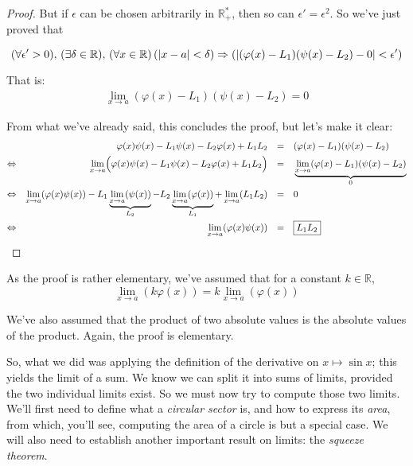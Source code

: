 \documentclass[solutions.tex]{subfiles}
\begin{document}
\begin{proof}
But if $\epsilon$ can be chosen arbitrarily in $\mathbb{R}^*_+$, then
so can $\epsilon'=\epsilon^2$. So we've just proved that

\[ \epsdelta{\epsilon'}{\delta}{a}{x}{(\varphi(x)-L_1)(\psi(x)-L_2)}{0}  \]

That is:
\begin{equation*} \begin{aligned}
	\lim_{x\rightarrow a}(\varphi(x)-L_1)(\psi(x)-L_2) = 0
\end{aligned} \end{equation*}

From what we've already said, this concludes the proof, but let's
make it clear:
\begin{equation*} \begin{aligned}
	~ && \varphi(x)\psi(x)-L_1\psi(x)-L_2\varphi(x)+L_1L_2 &&=\quad&
		(\varphi(x)-L_1)(\psi(x)-L_2) \\
	\Leftrightarrow &&
		\lim_{x\rightarrow a}\Bigl(\varphi(x)\psi(x)-L_1\psi(x)-L_2\varphi(x)+L_1L_2\Bigr) &&=\quad&
		\underbrace{\lim_{x\rightarrow a}(\varphi(x)-L_1)(\psi(x)-L_2)}_0 \\
	\Leftrightarrow &&
		\lim_{x\rightarrow a}(\varphi(x)\psi(x))
		-L_1\underbrace{\lim_{x\rightarrow a}(\psi(x))}_{L_2}
		-L_2\underbrace{\lim_{x\rightarrow a}(\varphi(x))}_{L_1}
		+\lim_{x\rightarrow a}(L_1L_2) &&=\quad& 0 \\
	\Leftrightarrow &&
		\lim_{x\rightarrow a}(\varphi(x)\psi(x)) &&=\quad& \boxed{L_1L_2}
\end{aligned} \end{equation*}
\end{proof}
\begin{remark} As the proof is rather elementary, we've assumed that for a
constant $k\in\mathbb{R}$,
\[
	\lim_{x\rightarrow a}(k\varphi(x))=k\lim_{x\rightarrow a}(\varphi(x))
\]

We've also assumed that the product of two absolute values is the
absolute values of the product. Again, the proof is elementary.
\end{remark}
\hrr

So, what we did was applying the definition of the derivative
on $x\mapsto\sin x$; this yields the limit of a sum. We know we can
split it into sums of limits, provided the two individual limits exist.
So we must now try to compute those two limits. \\

We'll first need to define what a \textit{circular sector} is,
and how to express its \textit{area}, from which, you'll see, computing
the area of a circle is but a special case. We will also need to establish
another important result on limits: the \textit{squeeze theorem}.
\end{document}
